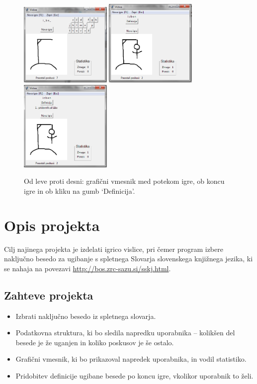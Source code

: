 \documentclass [a4paper, 12pt] {article}
\begin{document}
\begin {figure} [h]
\centering
\includegraphics [width=125pt] {slike/za_porocilo_gui_progress.png}
\includegraphics [width=125pt] {slike/za_porocilo_gui_zmaga.png}
\includegraphics [width=125pt] {slike/za_porocilo_gui_definicija.png}
\caption {Od leve proti desni: grafični vmesnik med potekom igre, ob koncu igre in ob kliku na gumb `Definicija'.}
\end {figure}

\section {Opis projekta}
Cilj najinega projekta je izdelati igrico vislice, pri čemer program izbere naključno besedo za ugibanje s spletnega Slovarja slovenskega knjižnega jezika, ki se nahaja na povezavi \url {http://bos.zrc-sazu.si/sskj.html}.
\subsection {Zahteve projekta}
\begin {itemize}
\item Izbrati naključno besedo iz spletnega slovarja.
\item Podatkovna struktura, ki bo sledila napredku uporabnika -- kolikšen del besede je že uganjen in koliko poskusov je še ostalo.
\item Grafični vmesnik, ki bo prikazoval napredek uporabnika, in vodil statistiko.
\item  Pridobitev definicije ugibane besede po koncu igre, vkolikor uporabnik to želi.
\end {itemize}
\end{document}
